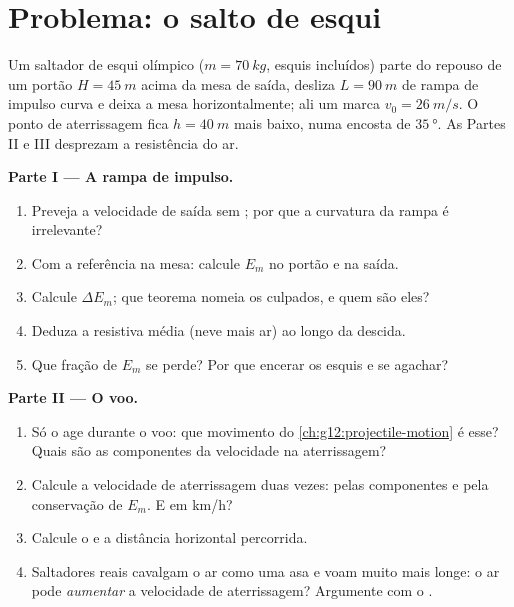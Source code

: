 \section{Problema: o salto de esqui}

\begin{problem}
\label{pb:g12:work-and-energy:1}
Um saltador de esqui olímpico ($m = \qty{70}{kg}$, esquis incluídos) parte do repouso
de um portão $H = \qty{45}{m}$ acima da mesa de saída, desliza $L = \qty{90}{m}$ de
rampa de impulso curva e deixa a mesa horizontalmente; ali um  marca
$v_0 = \qty{26}{m/s}$. O ponto de aterrissagem fica $h = \qty{40}{m}$ mais baixo, numa
encosta de $\qty{35}{\degree}$. As Partes II e III desprezam a resistência do ar.

\medskip\noindent\textbf{Parte I --- A rampa de impulso.}
\begin{enumerate}
  \item Preveja a velocidade de saída sem ; por que a curvatura da rampa é
        irrelevante?
  \item Com a referência na mesa: calcule $E_m$ no portão e na saída.
  \item Calcule $\Delta E_m$; que teorema nomeia os culpados, e quem são eles?
  \item Deduza a  resistiva média (neve mais ar) ao longo da descida.
  \item Que fração de $E_m$ se perde? Por que encerar os esquis e se agachar?
\end{enumerate}

\medskip\noindent\textbf{Parte II --- O voo.}
\begin{enumerate}[resume]
  \item Só o  age durante o voo: que movimento do
        \cref{ch:g12:projectile-motion} é esse? Quais são as componentes da velocidade
        na aterrissagem?
  \item Calcule a velocidade de aterrissagem duas vezes: pelas componentes e pela
        conservação de $E_m$. E em \unit{km/h}?
  \item Calcule o  e a distância horizontal percorrida.
  \item Saltadores reais cavalgam o ar como uma asa e voam muito mais longe: o ar pode
        \emph{aumentar} a velocidade de aterrissagem? Argumente com o .
\end{enumerate}


\end{problem}
